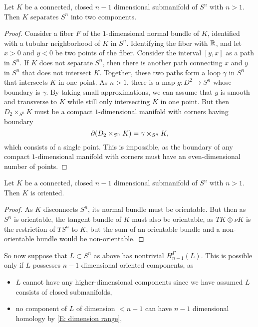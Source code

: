 \begin{example}
\begin{lemma}
Let $K$ be a connected, closed $n-1$ dimensional submanifold of $S^n$ with $n>1$.
Then $K$ separates $S^n$ into two components.
\end{lemma}
\begin{proof}
Consider a fiber $F$ of the $1$-dimensional normal bundle of $K$, identified with a tubular neighborhood of $K$ in $S^n$.
Identifying the fiber with $\mathbb{R}$, and let $x >0$ and $y < 0$ be two points of the fiber.
Consider the interval $[y,x]$ as a path in $S^n$.
If $K$ does not separate $S^n$, then there is another path connecting $x$ and $y$ in $S^n$ that does not intersect $K$.
Together, these two paths form a loop $\gamma$ in $S^n$ that intersects $K$ in one point.
As $n>1$, there is a map $g \colon D^2 \to S^n$ whose boundary is $\gamma$.
By taking small approximations, we can assume that $g$ is smooth and transverse to $K$ while still only intersecting $K$ in one point.
But then $D_2 \times_{S^n} K$ must be a compact $1$-dimensional manifold with corners having boundary $$\partial (D_2 \times_{S^n} K) = \gamma \times_{S^n} K,$$
which consists of a single point.
This is impossible, as the boundary of any compact $1$-dimensional manifold with corners must have an even-dimensional number of points.
\end{proof}

\begin{corollary}\label{C: codim 1 oriented}
Let $K$ be a connected, closed $n-1$ dimensional submanifold of $S^n$ with $n>1$.
Then $K$ is oriented.
\end{corollary}
\begin{proof}
As $K$ disconnects $S^n$, its normal bundle must be orientable.
But then as $S^n$ is orientable, the tangent bundle of $K$ must also be orientable, as $TK \oplus \nu K$ is the restriction of $TS^n$ to $K$, but the sum of an orientable bundle and a non-orientable bundle would be non-orientable.
\end{proof}



So now suppose that $L \subset S^n$ as above has nontrivial $H_{n-1}^\Gamma(L)$.
This is possible only if $L$ possesses $n-1$ dimensional oriented components, as

\begin{itemize}
\item $L$ cannot have any higher-dimensional components since we have assumed $L$ consists of closed submanifolds,

\item no component of $L$ of dimension $<n-1$ can have $n-1$ dimensional homology by \cref{E: dimension range},


\end{itemize}
\end{example}
